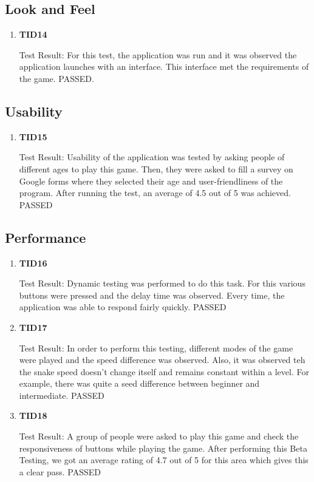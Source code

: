 \documentclass[12pt, titlepage]{article}
\begin{document}
\subsection{Look and Feel}
\begin{enumerate}
	
	\item{\textbf{TID14}\\}
	
	Test Result: For this test, the application was run and it was observed the application launches with an interface. This interface met the requirements of the game. PASSED.
	
\end{enumerate}

\subsection{Usability}

\begin{enumerate}
	
	\item{\textbf{TID15}\\}
	
	Test Result: Usability of the application was tested by asking people of different ages to play this game. Then, they were asked to fill a survey on Google forms where they selected their age and user-friendliness of the program. After running the test, an average of 4.5 out of 5 was achieved. PASSED
	
\end{enumerate}

\subsection{Performance}
\begin{enumerate}
	
	\item{\textbf{TID16}\\}
	
	Test Result: Dynamic testing was performed to do this task. For this various buttons were pressed and the delay time was observed. Every time, the application was able to respond fairly quickly. PASSED
	
	\item{\textbf{TID17}\\}
	
	Test Result: In order to perform this testing, different modes of the game were played and the speed difference was observed. Also, it was observed teh the snake speed doesn't change itself and remains constant within a level. For example, there was quite a seed difference between beginner and intermediate. PASSED
	
	\item{\textbf{TID18}\\}
	
	Test Result: A group of people were asked to play this game and check the responsiveness of buttons while playing the game. After performing this Beta Testing, we got an average rating of 4.7 out of 5 for this area which gives this a clear pass. PASSED
	
\end{enumerate}
\end{document}
